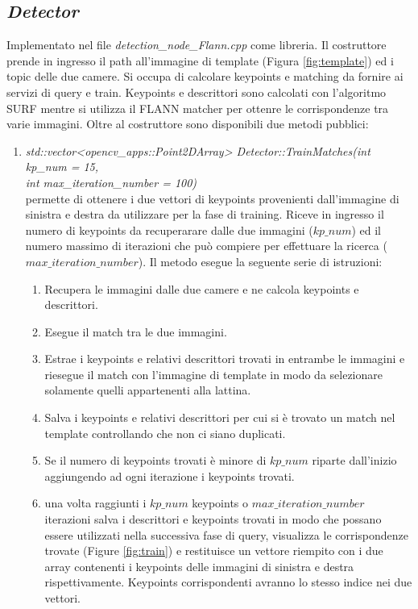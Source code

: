 \documentclass[english]{article}
\begin{document}
\subsection{\textit{Detector}}
Implementato nel file \textit{detection\_node\_Flann.cpp} come libreria. Il costruttore prende in ingresso il path all'immagine di template (Figura \ref{fig:template}) ed i topic delle due camere. Si occupa di calcolare keypoints e matching da fornire ai servizi di query e train. Keypoints e descrittori sono calcolati con l'algoritmo SURF mentre si utilizza il FLANN matcher per ottenre le corrispondenze tra varie immagini. Oltre al costruttore sono disponibili due metodi pubblici:
\begin{enumerate}
\item \textit{std::vector<opencv\_apps::Point2DArray> Detector::TrainMatches(int kp\_num = 15,\\ int max\_iteration\_number = 100)}
\\ permette di ottenere i due vettori di keypoints provenienti dall'immagine di sinistra e destra da utilizzare per la fase di training. Riceve in ingresso il numero di keypoints da recuperarare dalle due immagini ($kp\_num$) ed il numero massimo di iterazioni che può compiere per effettuare la ricerca ($max\_iteration\_number$). Il metodo esegue la seguente serie di istruzioni:
	\begin{enumerate}
	\item Recupera le immagini dalle due camere e ne calcola keypoints e descrittori.
	\item Esegue il match tra le due immagini.
	\item Estrae i keypoints e relativi descrittori trovati in entrambe le immagini e riesegue il match con l'immagine di template in modo da selezionare solamente quelli appartenenti alla lattina.
	\item Salva i keypoints e relativi descrittori per cui si è trovato un match nel template controllando che non ci siano duplicati.
	\item Se il numero di keypoints trovati è minore di $kp\_num$ riparte dall'inizio aggiungendo ad ogni iterazione i keypoints trovati.
	\item una volta raggiunti i $kp\_num$ keypoints o $max\_iteration\_number$ iterazioni salva i descrittori e keypoints trovati in modo che possano essere utilizzati nella successiva fase di query, visualizza le corrispondenze trovate (Figure \ref{fig:train}) e restituisce un vettore riempito con i due array contenenti i keypoints delle immagini di sinistra e destra rispettivamente. Keypoints corrispondenti avranno lo stesso indice nei due vettori.
	\end{enumerate} 


\end{enumerate}
\end{document}
